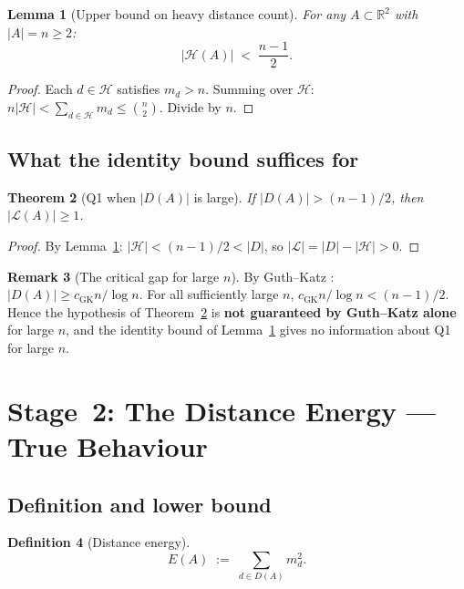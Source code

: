 \documentclass[12pt,a4paper]{amsart}
\theoremstyle{plain}
\newtheorem{theorem}{Theorem}[section]
\newtheorem{lemma}[theorem]{Lemma}
\theoremstyle{definition}
\newtheorem{definition}[theorem]{Definition}
\newtheorem{remark}[theorem]{Remark}
\newcommand{\R}{\mathbb{R}}
\newcommand{\abs}[1]{\left\lvert #1 \right\rvert}
\newcommand{\cL}{\mathcal{L}}
\newcommand{\cH}{\mathcal{H}}
\begin{document}
\begin{lemma}[Upper bound on heavy distance count]
\label{lem:H_id}
For any $A \subset \R^2$ with $\abs{A} = n \ge 2$:
\[
  \abs{\cH(A)} \;<\; \frac{n-1}{2}.
\]
\end{lemma}

\begin{proof}
Each $d \in \cH$ satisfies $m_d > n$.  Summing over $\cH$:
$n \abs{\cH} < \sum_{d \in \cH} m_d \le \binom{n}{2}$.
Divide by $n$.
\end{proof}

\subsection{What the identity bound suffices for}

\begin{theorem}[Q1 when $\abs{D(A)}$ is large]
\label{thm:Q1_large_D}
If $\abs{D(A)} > (n-1)/2$, then $\abs{\cL(A)} \ge 1$.
\end{theorem}

\begin{proof}
By Lemma~\ref{lem:H_id}: $\abs{\cH} < (n-1)/2 < \abs{D}$, so
$\abs{\cL} = \abs{D} - \abs{\cH} > 0$.
\end{proof}

\begin{remark}[The critical gap for large $n$]
\label{rem:gap}
By Guth--Katz \cite{GK15}: $\abs{D(A)} \ge c_{\mathrm{GK}} n/\log n$.
For all sufficiently large $n$, $c_{\mathrm{GK}} n/\log n < (n-1)/2$.
Hence the hypothesis of Theorem~\ref{thm:Q1_large_D} is
\textbf{not guaranteed by Guth--Katz alone} for large $n$,
and the identity bound of Lemma~\ref{lem:H_id} gives no
information about Q1 for large $n$.
\end{remark}

\section{Stage~2: The Distance Energy --- True Behaviour}
\label{sec:error_and_grid}

\subsection{Definition and lower bound}

\begin{definition}[Distance energy]
\[
  E(A) \;:=\; \sum_{d \in D(A)} m_d^2.
\]
\end{definition}
\end{document}
